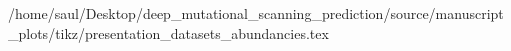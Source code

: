 /home/saul/Desktop/deep_mutational_scanning_prediction/source/manuscript_plots/tikz/presentation_datasets_abundancies.tex